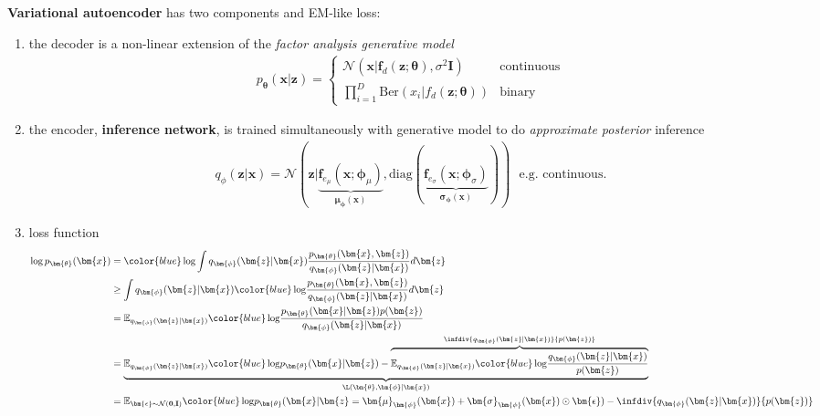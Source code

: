 \textbf{Variational autoencoder} has two components and EM-like loss: 
\begin{enumerate}[(1)]
    \item the decoder is a non-linear extension of the \textit{factor analysis generative model}
    \begin{gather}
        p_{\bm{\theta}}(\bm{x}|\bm{z}) = \begin{cases}
            \mathcal{N}(\bm{x}|\bm{f}_d(\bm{z};\bm{\theta}),\sigma^2\mathbf{I}) & \text{continuous} \\
            \prod_{i=1}^D\mathrm{Ber}(x_i|f_d(\bm{z};\bm{\theta})) & \text{binary}
        \end{cases}
    \end{gather}

    \item the encoder, \textbf{inference network}, is trained simultaneously with generative model to do \textit{approximate posterior} inference
    \begin{gather}
        q_{\phi}(\bm{z}|\bm{x}) = \mathcal{N}(\bm{z}|\underbrace{\bm{f}_{e_\mu}(\bm{x};\bm{\phi}_\mu)}_{\bm{\mu}_{\bm{\phi}}(\bm{x})},\mathrm{diag}(\underbrace{\bm{f}_{e_\sigma}(\bm{x};\bm{\phi}_\sigma)}_{\bm{\sigma}_{\bm{\phi}}(\bm{x})})) ~~~ \text{e.g. continuous}.
    \end{gather}

    \item loss function
    \begin{align}
        \log p_{\bm{\theta}}(\bm{x}) 
        & = {\color{blue}\log} \int q_{\bm{\phi}}(\bm{z}|\bm{x})\frac{p_{\bm{\theta}}(\bm{x},\bm{z})}{q_{\bm{\phi}}(\bm{z}|\bm{x})} d\bm{z} \\
        & \geq  \int q_{\bm{\phi}}(\bm{z}|\bm{x}) {\color{blue}\log} \frac{p_{\bm{\theta}}(\bm{x},\bm{z})}{q_{\bm{\phi}}(\bm{z}|\bm{x})} d\bm{z} \\
        & = \mathbb{E}_{q_{\bm{\phi}}(\bm{z}|\bm{x})} {\color{blue}\log} \frac{p_{\bm{\theta}}(\bm{x}|\bm{z})p(\bm{z})}{q_{\bm{\phi}}(\bm{z}|\bm{x})} \\
        & = \underbrace{\mathbb{E}_{q_{\bm{\phi}}(\bm{z}|\bm{x})} {\color{blue}\log} p_{\bm{\theta}}(\bm{x}|\bm{z}) - \overbrace{\mathbb{E}_{q_{\bm{\phi}}(\bm{z}|\bm{x})} {\color{blue}\log} \frac{q_{\bm{\phi}}(\bm{z}|\bm{x})}{p(\bm{z})}}^{\infdiv{q_{\bm{\phi}}(\bm{z}|\bm{x})}{p(\bm{z})}}}_{\L(\bm{\theta},\bm{\phi}|\bm{x})} \\
        & = \mathbb{E}_{\bm{\epsilon}\sim\mathcal{N}(\mathbf{0},\mathbf{I})} {\color{blue}\log} p_{\bm{\theta}}(\bm{x}|\bm{z}=\bm{\mu}_{\bm{\phi}}(\bm{x}) + \bm{\sigma}_{\bm{\phi}}(\bm{x}) \odot \bm{\epsilon}) - \infdiv{q_{\bm{\phi}}(\bm{z}|\bm{x})}{p(\bm{z})}
    \end{align}
\end{enumerate}



